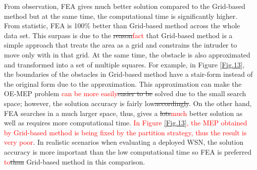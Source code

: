 \documentclass[final]{elsarticle}
\begin{document}
From observation, FEA gives much better solution compared to the Grid-based method but at the same time, the computational time is significantly higher. From statistic, FEA is 100\% better than Grid-based method across the whole data set. This surpass is due to the \sout{reason}\textcolor{red}{fact} that Grid-based method is a simple approach that treats the area as a grid and constrains the intruder to move only  with in that grid. At the same time, the obstacle is also approximated and transformed into a set of multiple squares. For example, in Figure \ref{Fig.13}, the boundaries of the obstacles in Grid-based method have a stair-form instead of the original form due to the approximation. This approximation can make the OE-MEP problem \textcolor{red}{can be more easily}\sout{easier to be} solved due to the small search space; however, the solution accuracy is fairly low\sout{accordingly}. On the other hand, FEA searches in a much larger space, thus, gives a \sout{lots}\textcolor{red}{much} better solution as well as requires more computational time. \textcolor{red}{In Figure \ref{Fig.13}, the MEP obtained by Grid-based method is being fixed by the partition strategy, thus the result is very poor}. In realistic scenarios when evaluating a deployed WSN, the solution accuracy is more important than the low computational time so FEA is preferred \textcolor{red}{to}\sout{than} Grid-based method in this comparison. 
\end{document}
